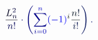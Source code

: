 \documentclass[12pt]{article}
\begin{document}
\makeatletter
\renewcommand*{\@textcolor}[3]{%
  \protect\leavevmode
  \begingroup
    \color#1{#2}#3%
  \endgroup
}
\makeatother
\begin{displaymath}
\mathcolor[RGB]{0,0,15}{\frac { \mathcolor[RGB]{0,0,30}{L} _ { \mathcolor[RGB]{0,0,45}{n} } ^ { \mathcolor[RGB]{0,0,60}{2} } } { \mathcolor[RGB]{0,0,75}{n} \mathcolor[RGB]{0,0,90}{!} } } \mathcolor[RGB]{0,0,105}{\cdot} \mathcolor[RGB]{0,0,120}{\left(} \mathcolor[RGB]{0,0,135}{\sum} _ { \mathcolor[RGB]{0,0,150}{i} \mathcolor[RGB]{0,0,165}{=} \mathcolor[RGB]{0,0,180}{0} } ^ { \mathcolor[RGB]{0,0,195}{n} } \mathcolor[RGB]{0,0,210}{(} \mathcolor[RGB]{0,0,225}{-} \mathcolor[RGB]{0,0,240}{1} \mathcolor[RGB]{0,0,255}{)} ^ { \mathcolor[RGB]{0,15,0}{i} } \mathcolor[RGB]{0,15,15}{\frac { \mathcolor[RGB]{0,15,30}{n} \mathcolor[RGB]{0,15,45}{!} } { \mathcolor[RGB]{0,15,60}{i} \mathcolor[RGB]{0,15,75}{!} } } \mathcolor[RGB]{0,15,90}{\right)} \mathcolor[RGB]{0,15,105}{.}
\end{displaymath}
\end{document}
